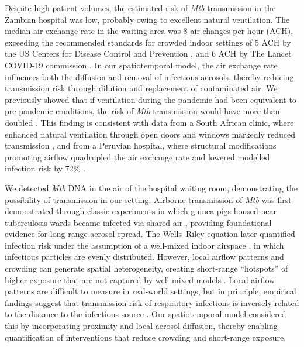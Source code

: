 \documentclass[11pt]{article}
\begin{document}
Despite high patient volumes, the estimated risk of \emph{Mtb} transmission in the Zambian hospital was low, probably owing to excellent natural ventilation. The median air exchange rate in the waiting area was 8 air changes per hour (ACH), exceeding the recommended standards for crowded indoor settings of 5 ACH by the US Centers for Disease Control and Prevention \cite{uscentersfordiseasecontrolandprevention2025RespiratoryIllnesses}, and 6 ACH by The Lancet COVID-19 commission \cite{thelancetcovid-19commissiontaskforceonsafeworksafeschoolandsafetravel2022}. In our spatiotemporal model, the air exchange rate influences both the diffusion and removal of infectious aerosols, thereby reducing transmission risk through dilution and replacement of contaminated air. We previously showed that if ventilation during the pandemic had been equivalent to pre-pandemic conditions, the  risk of \emph{Mtb} transmission would have more than doubled \cite{banholzer2025PLOSComputBiol}. This finding is consistent with data from a South African clinic, where enhanced natural ventilation through open doors and windows markedly reduced transmission \cite{beckwith2022PLOSGlobalPublicHealth}, and from a Peruvian hospital, where structural modifications promoting airflow quadrupled the air exchange rate and lowered modelled infection risk by 72\% \cite{escombe2019BMCInfectDis}.

We detected \emph{Mtb} DNA in the air of the hospital waiting room, demonstrating the possibility of transmission in our setting. Airborne transmission of \emph{Mtb} was first demonstrated through classic experiments in which guinea pigs housed near tuberculosis wards became infected via shared air \cite{riley1959AmJEpidemiol}, providing foundational evidence for long-range aerosol spread. The Wells--Riley equation later quantified infection risk under the assumption of a well-mixed indoor airspace \cite{riley1978AmJEpidemiol}, in which infectious particles are evenly distributed. However, local airflow patterns and crowding can generate spatial heterogeneity, creating short-range ``hotspots'' of higher exposure that are not captured by well-mixed models \cite{ding2025BuildEnviron,poydenot2022PNASNexus}. Local airflow patterns are difficult to measure in real-world settings, but in principle, empirical findings suggest that transmission risk of respiratory infections is inversely related to the distance to the infectious source \cite{ko2004RiskAnal,kenyon1996NEnglJMed,hu2021ClinInfectDis}. Our spatiotemporal model considered this by incorporating proximity and local aerosol diffusion, thereby enabling quantification of interventions that reduce crowding and short-range exposure.
\end{document}
